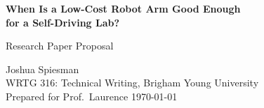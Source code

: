 \documentclass[11pt,letterpaper]{article}
\newcommand{\proposaltitle}{When Is a Low-Cost Robot Arm Good Enough\\[0.1em]
  for a Self-Driving Lab?}
\begin{document}
\begin{center}
  {\LARGE\bfseries \proposaltitle\par}
  \vspace{0.5em}
  {\large Research Paper Proposal\par}
  \vspace{0.6em}
  Joshua Spiesman\\
  WRTG 316: Technical Writing, Brigham Young University\\
  Prepared for Prof.\ Laurence \quad\textbullet\quad \today
\end{center}
\vspace{0.5em}







\end{document}

